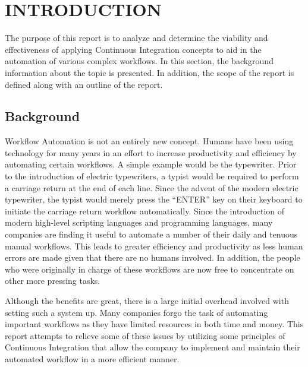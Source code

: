 \section{INTRODUCTION} %
\label{sec:introduction}
	The purpose of this report is to analyze and determine the viability and effectiveness of applying Continuous Integration concepts to aid in the automation of various complex workflows. In this section, the background information about the topic is presented. In addition, the scope of the report is defined along with an outline of the report.
	
	\subsection{Background} %
	\label{sub:background}
Workflow Automation is not an entirely new concept. Humans have been using technology for many years in an effort to increase productivity and efficiency by automating certain workflows. A simple example would be the typewriter. Prior to the introduction of electric typewriters, a typist would be required to perform a carriage return at the end of each line.  Since the advent of the modern electric typewriter, the typist would merely press the ``ENTER'' key on their keyboard to initiate the carriage return workflow automatically. Since the introduction of modern high-level scripting languages and programming languages, many companies are finding it useful to automate a number of their daily and tenuous manual workflows.  This leads to greater efficiency and productivity as less human errors are made given that there are no humans involved.  In addition, the people who were originally in charge of these workflows are now free to concentrate on other more pressing tasks.\newline

Although the benefits are great, there is a large initial overhead involved with setting such a system up. Many companies forgo the task of automating important workflows as they have limited resources in both time and money.  This report attempts to relieve some of these issues by utilizing some principles of Continuous Integration that allow the company to implement and maintain their automated workflow in a more efficient manner.\newline

